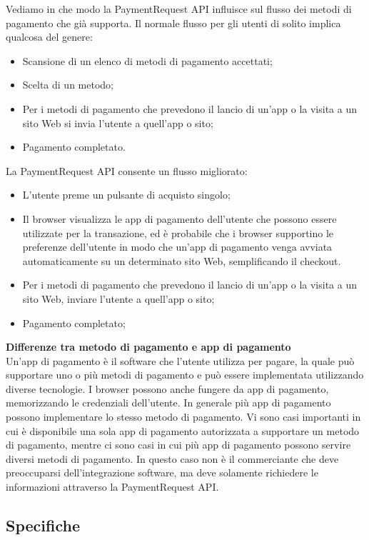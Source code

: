 \documentclass[11pt ,a4paper , twoside , openright ]{article}
\begin{document}
Vediamo in che modo la PaymentRequest API influisce sul flusso dei metodi di pagamento che già supporta. Il normale flusso per gli utenti di solito implica qualcosa del genere:
\begin{itemize}
	\item Scansione di un elenco di metodi di pagamento accettati;
	\item Scelta di un metodo;
	\item Per i metodi di pagamento che prevedono il lancio di un'app o la visita a un sito Web si invia l'utente a quell'app o sito;
	\item Pagamento completato.
\end{itemize}
La PaymentRequest API consente un flusso migliorato:
\begin{itemize}
	\item L'utente preme un pulsante di acquisto singolo;
	\item Il browser visualizza le app di pagamento dell'utente che possono essere utilizzate per la transazione, ed è probabile che i browser supportino le preferenze dell'utente in modo che un'app di pagamento venga avviata automaticamente su un determinato sito Web, semplificando il checkout.
	\item Per i metodi di pagamento che prevedono il lancio di un'app o la visita a un sito Web, inviare l'utente a quell'app o sito; 
	\item Pagamento completato; 
\end{itemize}
\textbf{Differenze tra metodo di pagamento e app di pagamento}
\\
Un'app di pagamento è il software che l'utente utilizza per pagare, la quale può supportare uno o più metodi di pagamento e può essere implementata utilizzando diverse tecnologie. I browser possono anche fungere da app di pagamento, memorizzando le credenziali dell'utente. In generale più app di pagamento possono implementare lo stesso metodo di pagamento. 
Vi sono casi importanti in cui è disponibile una sola app di pagamento autorizzata a supportare un metodo di pagamento, mentre ci sono casi in cui più app di pagamento possono servire diversi metodi di pagamento. In questo caso non è il commerciante che deve preoccuparsi dell'integrazione software, ma deve solamente richiedere le informazioni attraverso la PaymentRequest API.

\subsection{Specifiche}
\end{document}
